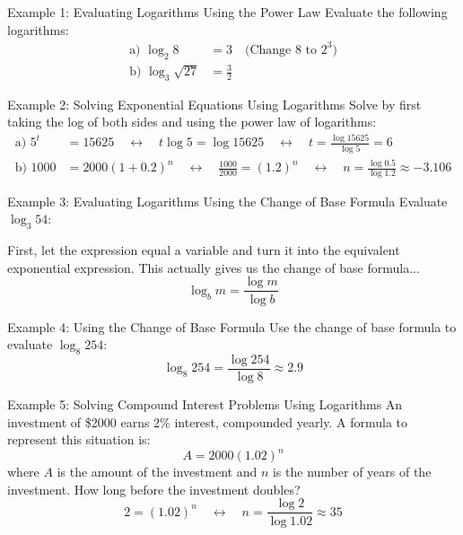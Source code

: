 \documentclass{article}
\begin{document}
\begin{examplebox}{Example 1: Evaluating Logarithms Using the Power Law}
Evaluate the following logarithms:
\begin{align*}
    \text{a) } \log_2{8} &= 3 \quad \text{(Change 8 to } 2^3)\\
    \text{b) } \log_3{\sqrt{27}} &= \frac{3}{2}
\end{align*}
\end{examplebox}

\begin{examplebox}{Example 2: Solving Exponential Equations Using Logarithms}
Solve by first taking the log of both sides and using the power law of logarithms:
\begin{align*}
    \text{a) } 5^t &= 15625 \quad \leftrightarrow \quad t \log{5} = \log{15625} \quad \leftrightarrow \quad t = \frac{\log{15625}}{\log{5}} = 6\\
    \text{b) } 1000 &= 2000(1+0.2)^n \quad \leftrightarrow \quad \frac{1000}{2000} = (1.2)^n \quad \leftrightarrow \quad n = \frac{\log{0.5}}{\log{1.2}} \approx -3.106
\end{align*}
\end{examplebox}

\begin{examplebox}{Example 3: Evaluating Logarithms Using the Change of Base Formula}
Evaluate \(\log_3{54}\):

First, let the expression equal a variable and turn it into the equivalent exponential expression. This actually gives us the change of base formula...
\[
\log_b{m} = \frac{\log{m}}{\log{b}}
\]
\end{examplebox}

\begin{examplebox}{Example 4: Using the Change of Base Formula}
Use the change of base formula to evaluate \(\log_8{254}\):
\[
\log_8{254} = \frac{\log{254}}{\log{8}} \approx 2.9
\]
\end{examplebox}

\begin{examplebox}{Example 5: Solving Compound Interest Problems Using Logarithms}
An investment of \$2000 earns 2\% interest, compounded yearly. A formula to represent this situation is:
\[
A = 2000 (1.02)^n
\]
where \( A \) is the amount of the investment and \( n \) is the number of years of the investment. How long before the investment doubles?
\[
2 = (1.02)^n \quad \leftrightarrow \quad n = \frac{\log{2}}{\log{1.02}} \approx 35
\]
\end{examplebox}
\end{document}
